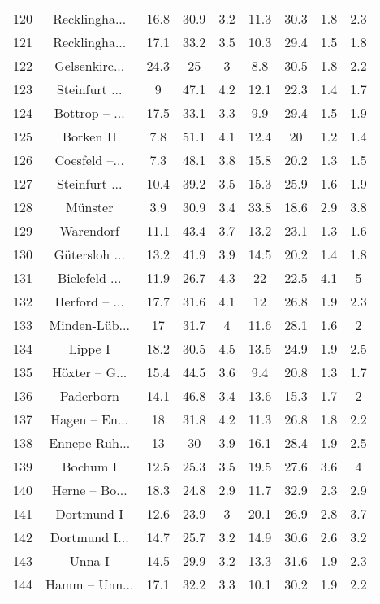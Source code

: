 \begin{table}[!htbp]
\begin{tabular}{@{\extracolsep{5pt}} ccccccccc}
120 & Recklingha... & 16.8 & 30.9 & 3.2 & 11.3 & 30.3 & 1.8 & 2.3 \\ 
121 & Recklingha... & 17.1 & 33.2 & 3.5 & 10.3 & 29.4 & 1.5 & 1.8 \\ 
122 & Gelsenkirc... & 24.3 & 25 & 3 & 8.8 & 30.5 & 1.8 & 2.2 \\ 
123 & Steinfurt ... & 9 & 47.1 & 4.2 & 12.1 & 22.3 & 1.4 & 1.7 \\ 
124 & Bottrop – ... & 17.5 & 33.1 & 3.3 & 9.9 & 29.4 & 1.5 & 1.9 \\ 
125 & Borken II & 7.8 & 51.1 & 4.1 & 12.4 & 20 & 1.2 & 1.4 \\ 
126 & Coesfeld –... & 7.3 & 48.1 & 3.8 & 15.8 & 20.2 & 1.3 & 1.5 \\ 
127 & Steinfurt ... & 10.4 & 39.2 & 3.5 & 15.3 & 25.9 & 1.6 & 1.9 \\ 
128 & Münster & 3.9 & 30.9 & 3.4 & 33.8 & 18.6 & 2.9 & 3.8 \\ 
129 & Warendorf & 11.1 & 43.4 & 3.7 & 13.2 & 23.1 & 1.3 & 1.6 \\ 
130 & Gütersloh ... & 13.2 & 41.9 & 3.9 & 14.5 & 20.2 & 1.4 & 1.8 \\ 
131 & Bielefeld ... & 11.9 & 26.7 & 4.3 & 22 & 22.5 & 4.1 & 5 \\ 
132 & Herford – ... & 17.7 & 31.6 & 4.1 & 12 & 26.8 & 1.9 & 2.3 \\ 
133 & Minden-Lüb... & 17 & 31.7 & 4 & 11.6 & 28.1 & 1.6 & 2 \\ 
134 & Lippe I & 18.2 & 30.5 & 4.5 & 13.5 & 24.9 & 1.9 & 2.5 \\ 
135 & Höxter – G... & 15.4 & 44.5 & 3.6 & 9.4 & 20.8 & 1.3 & 1.7 \\ 
136 & Paderborn & 14.1 & 46.8 & 3.4 & 13.6 & 15.3 & 1.7 & 2 \\ 
137 & Hagen – En... & 18 & 31.8 & 4.2 & 11.3 & 26.8 & 1.8 & 2.2 \\ 
138 & Ennepe-Ruh... & 13 & 30 & 3.9 & 16.1 & 28.4 & 1.9 & 2.5 \\ 
139 & Bochum I & 12.5 & 25.3 & 3.5 & 19.5 & 27.6 & 3.6 & 4 \\ 
140 & Herne – Bo... & 18.3 & 24.8 & 2.9 & 11.7 & 32.9 & 2.3 & 2.9 \\ 
141 & Dortmund I & 12.6 & 23.9 & 3 & 20.1 & 26.9 & 2.8 & 3.7 \\ 
142 & Dortmund I... & 14.7 & 25.7 & 3.2 & 14.9 & 30.6 & 2.6 & 3.2 \\ 
143 & Unna I & 14.5 & 29.9 & 3.2 & 13.3 & 31.6 & 1.9 & 2.3 \\ 
144 & Hamm – Unn... & 17.1 & 32.2 & 3.3 & 10.1 & 30.2 & 1.9 & 2.2 \\ 

\end{tabular}
\end{table}
